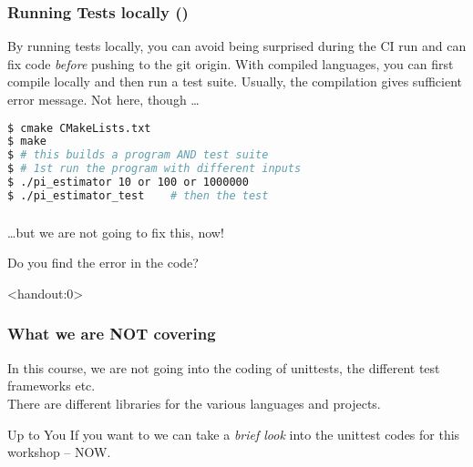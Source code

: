\begin{frame}[fragile]
	\frametitle{Running Tests locally (\CC)}
	\begin{warning}
		{By running tests locally, you can avoid being surprised during the CI run and can fix code \emph{before} pushing to the git origin. With compiled languages, you can first compile locally and then run a test suite. Usually, the compilation gives sufficient error message. Not here, though \ldots}
	\end{warning}
	\pause
	\begin{lstlisting}[language=Bash, style=Shell]
$ cmake CMakeLists.txt
$ make
$ # this builds a program AND test suite
$ # 1st run the program with different inputs
$ ./pi_estimator 10 or 100 or 1000000  
$ ./pi_estimator_test    # then the test
	\end{lstlisting}	
\end{frame}

\begin{frame}
	\frametitle{}
	\ldots but we are not going to fix this, now!
	\begin{question}
		{Do you find the error in the code?}
	\end{question}
\end{frame}

\begin{frame}<handout:0>
	\frametitle{What we are NOT covering}
	\begin{warning}[Unittests]
		{In this course, we are not going into the coding of unittests, the different test frameworks etc.\\
			There are different libraries for the various languages and projects.}
	\end{warning}
	\pause
	\begin{block}{Up to You}
		{If you want to we can take a \emph{brief look} into the unittest codes for this workshop -- NOW.}
	\end{block}	
\end{frame}
